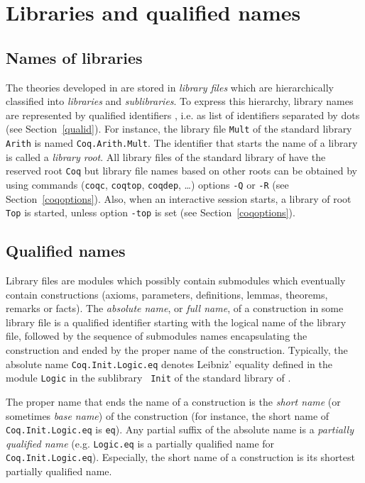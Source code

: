 

\section{Libraries and qualified names}

\subsection{Names of libraries
\label{Libraries}
}

The theories developed in {\Coq} are stored in {\em library files}
which are hierarchically classified into {\em libraries} and {\em
  sublibraries}. To express this hierarchy, library names are
represented by qualified identifiers {\qualid}, i.e. as list of
identifiers separated by dots (see Section~\ref{qualid}). For
instance, the library file {\tt Mult} of the standard {\Coq} library
{\tt Arith} is named {\tt Coq.Arith.Mult}. The identifier that starts
the name of a library is called a {\em library root}.  All library
files of the standard library of {\Coq} have the reserved root {\tt Coq}
but library file names based on other roots can be obtained by using
{\Coq} commands ({\tt coqc}, {\tt coqtop}, {\tt coqdep}, \dots) options
{\tt -Q} or {\tt -R} (see Section~\ref{coqoptions}). Also, when an
interactive {\Coq} session starts, a library of root {\tt Top} is
started, unless option {\tt -top} is set (see
Section~\ref{coqoptions}).

\subsection{Qualified names
\label{LongNames}
}

Library files are modules which possibly contain submodules which
eventually contain constructions (axioms, parameters, definitions,
lemmas, theorems, remarks or facts). The {\em absolute name}, or {\em
full name}, of a construction in some library file is a qualified
identifier starting with the logical name of the library file,
followed by the sequence of submodules names encapsulating the
construction and ended by the proper name of the construction.
Typically, the absolute name {\tt Coq.Init.Logic.eq} denotes Leibniz'
equality defined in the module {\tt Logic} in the sublibrary {\tt
Init} of the standard library of \Coq.

The proper name that ends the name of a construction is the {\it short
name} (or sometimes {\it base name}) of the construction (for
instance, the short name of {\tt Coq.Init.Logic.eq} is {\tt eq}). Any
partial suffix of the absolute name is a {\em partially qualified name}
(e.g. {\tt Logic.eq} is a partially qualified name for {\tt
Coq.Init.Logic.eq}).  Especially, the short name of a construction is
its shortest partially qualified name.

